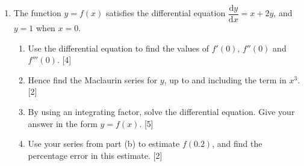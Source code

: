 \documentclass[12pt, twoside]{article}
\begin{document}
\begin{enumerate}[itemsep=0.15cm]
\item[5.] [Maximum mark: 13]

The function $y = f(x)$ satisfies the differential equation
$\dfrac{\mathrm{d}y}{\mathrm{d}x} = x + 2y$, and $y = 1$ when $x = 0$.

\begin{enumerate}[itemsep=0.05cm]
  \item Use the differential equation to find the values of $f'(0)$,
  $f''(0)$ and $f'''(0)$. \hfill [4]
  \item Hence find the Maclaurin series for $y$, up to and including the
  term in $x^{3}$. \hfill [2]
  \item By using an integrating factor, solve the differential equation.
  Give your answer in the form $y = f(x)$. \hfill [5]
  \item Use your series from part (b) to estimate $f(0.2)$, and find the
  percentage error in this estimate. \hfill [2]
\end{enumerate}

\end{enumerate}
\end{document}
